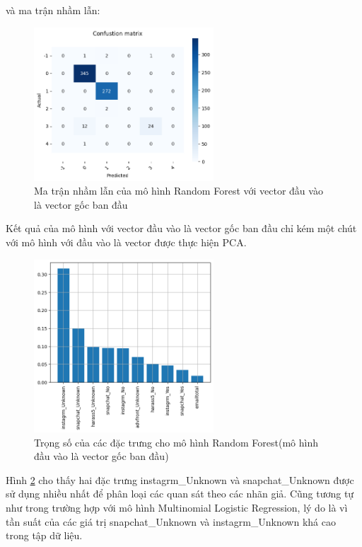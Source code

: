 \begin{enumerate}[label=(\alph*)]
    và ma trận nhầm lẫn:

    \begin{figure}[H]
        \centering
        \includegraphics[width=0.6\textwidth]{figures/Thanh/Data_Analysis/Non_null_confusion_matrix_Random_Forest_original_features.png}
        \caption{Ma trận nhầm lẫn của mô hình Random Forest với vector đầu vào là vector gốc ban đầu}
        \label{fig:Non_null_confusion_matrix_Random_Forest_original_features}
    \end{figure}

    Kết quả của mô hình với vector đầu vào là vector gốc ban đầu chỉ kém một chút với mô hình với đầu vào là vector được thực hiện PCA.

    \begin{figure}[H]
        \centering
        \includegraphics[width=0.6\textwidth]{figures/Thanh/Data_Analysis/Non_null_Feature_Importance_Random_Forest_original_features.png}
        \caption{Trọng số của các đặc trưng cho mô hình Random Forest(mô hình đầu vào là vector gốc ban đầu)}
        \label{fig:Non_null_Feature_Importance_Random_Forest_original_features}
    \end{figure}

    Hình \ref{fig:Non_null_Feature_Importance_Random_Forest_original_features} cho thấy hai đặc trưng instagrm\_Unknown và snapchat\_Unknown được sử dụng nhiều nhất để phân loại các quan sát theo các nhãn giả.
    Cũng tương tự như trong trường hợp với mô hình Multinomial Logistic Regression, lý do là vì tần suất của các giá trị snapchat\_Unknown và instagrm\_Unknown khá cao trong tập dữ liệu.

\end{enumerate}

